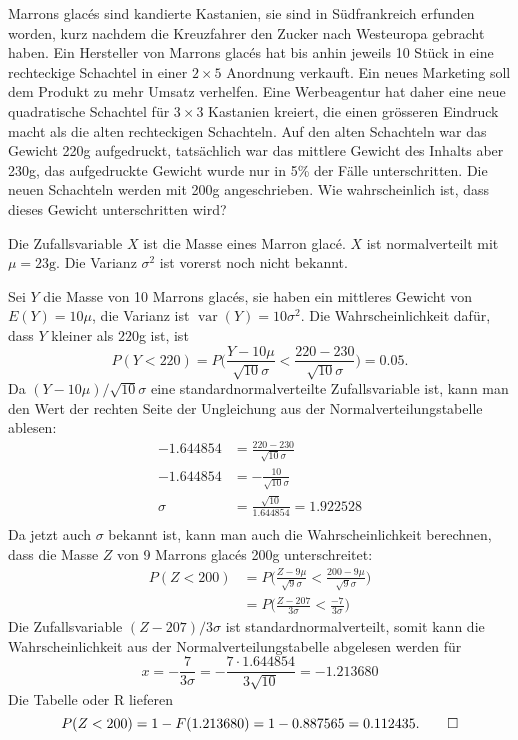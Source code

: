 Marrons glac\'es sind kandierte Kastanien, sie sind in Südfrankreich
erfunden worden, kurz nachdem die Kreuzfahrer den Zucker nach Westeuropa
gebracht haben. Ein Hersteller von Marrons glac\'es hat bis anhin
jeweils 10 Stück in eine rechteckige Schachtel in einer $2\times 5$
Anordnung verkauft. Ein neues Marketing soll dem Produkt zu mehr
Umsatz verhelfen. Eine Werbeagentur hat daher eine neue quadratische Schachtel 
für $3\times 3$ Kastanien kreiert, die einen grösseren Eindruck
macht als die alten rechteckigen Schachteln. Auf den alten Schachteln
war das Gewicht 220g aufgedruckt, tatsächlich war das mittlere
Gewicht des Inhalts aber 230g, das aufgedruckte Gewicht wurde
nur in 5\% der Fälle unterschritten. Die neuen Schachteln werden mit
200g angeschrieben. Wie wahrscheinlich ist, dass dieses Gewicht unterschritten
wird?


\begin{loesung}
Die Zufallsvariable $X$ ist die Masse eines Marron glac\'e. $X$ ist
normalverteilt mit $\mu = 23\text{g}$. Die Varianz $\sigma^2$ ist vorerst
noch nicht bekannt.

Sei $Y$ die Masse von 10 Marrons glac\'es, sie haben ein mittleres Gewicht von
$E(Y)=10\mu$, die Varianz ist $\operatorname{var}(Y)=10\sigma^2$.
Die Wahrscheinlichkeit dafür, dass $Y$ kleiner als $220$g ist, ist
\[
P(Y<220)=P\biggl(\frac{Y-10\mu}{\sqrt{10}\sigma}<\frac{220-230}{\sqrt{10}\sigma}\biggr)=0.05.
\]
Da $(Y-10\mu)/\sqrt{10}\sigma$ eine standardnormalverteilte Zufallsvariable
ist, kann man den Wert der rechten Seite der Ungleichung aus der
Normalverteilungstabelle ablesen:
\begin{align*}
-1.644854&= \frac{220-230}{\sqrt{10}\sigma}\\
-1.644854&= -\frac{10}{\sqrt{10}\sigma}\\
\sigma &= \frac{\sqrt{10}}{1.644854}=1.922528\\
\end{align*}
Da jetzt auch $\sigma$ bekannt ist, kann man auch die Wahrscheinlichkeit
berechnen, dass die Masse $Z$ von 9 Marrons glac\'es 200g unterschreitet:
\begin{align*}
P(Z<200)
&=
P\biggl(\frac{Z-9\mu}{\sqrt{9}\sigma}<\frac{200-9\mu}{\sqrt{9}\sigma} \biggr)
\\
&=
P\biggl(\frac{Z-207}{3\sigma}<\frac{-7}{3\sigma} \biggr)
\end{align*}
Die Zufallsvariable $(Z-207)/3\sigma$ ist standardnormalverteilt, somit
kann die Wahrscheinlichkeit aus der Normalverteilungstabelle abgelesen
werden für
\[
x=-\frac{7}{3\sigma}=-\frac{7\cdot1.644854}{3\sqrt{10}}=-1.213680
\]
Die Tabelle oder R lieferen
\[
P(Z<200)=1-F(1.213680)=1-0.887565=0.112435.
\qedhere
\]
\end{loesung}


